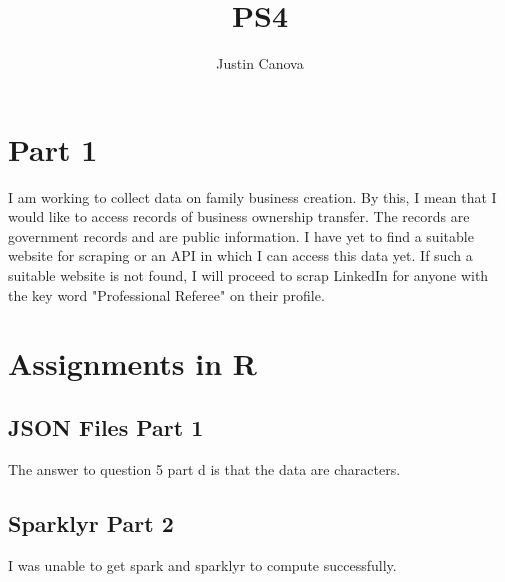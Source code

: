 \documentclass{article}
\title{PS4}
\author{Justin Canova}
\begin{document}
\maketitle

\section{Part 1}
I am working to collect data on family business creation.  By this, I mean that I would like to access records of business ownership transfer.  The records are government records and are public information.  I have yet to find a suitable website for scraping or an API in which I can access this data yet.  If such a suitable website is not found, I will proceed to scrap LinkedIn for anyone with the key word "Professional Referee" on their profile.

\section{Assignments in R}

\subsection{JSON Files Part 1}
The answer to question 5 part d is that the data are characters.

\subsection{Sparklyr Part 2}
I was unable to get spark and sparklyr to compute successfully.
\end{document}
